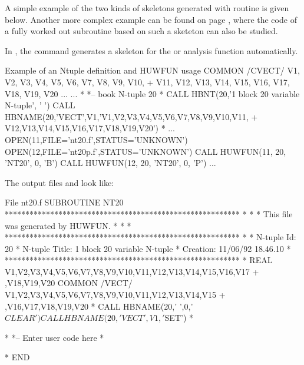 A simple example of the two kinds of skeletons generated with
routine  is given below. 
Another more complex example can be found on page \pageref{sec:staffskeleton},
where the code of a fully worked out subroutine based on such
a sketeton can also be studied.

In \PAW{}, the command  generates a skeleton for the
\RWN{} or \CWN{} analysis function automatically.

\newpage %

\begin{XMPt}{Example of an Ntuple definition and HUWFUN usage}
      COMMON /CVECT/ V1, V2, V3, V4, V5, V6, V7, V8, V9, V10,
     +               V11, V12, V13, V14, V15, V16, V17, V18, V19, V20
      ...
      ...
*
*-- book N-tuple 20
*
      CALL HBNT(20,'1 block 20 variable N-tuple', ' ')
      CALL HBNAME(20,'VECT',V1,'V1,V2,V3,V4,V5,V6,V7,V8,V9,V10,V11,
     +                          V12,V13,V14,V15,V16,V17,V18,V19,V20')
*
      ...
      OPEN(11,FILE='nt20.f',STATUS='UNKNOWN')
      OPEN(12,FILE='nt20p.f',STATUS='UNKNOWN')
      CALL HUWFUN(11, 20, 'NT20', 0, 'B')
      CALL HUWFUN(12, 20, 'NT20', 0, 'P')
      ...
\end{XMPt}
The  output files  and  look like:
\begin{XMPt}{File nt20.f}
      SUBROUTINE NT20
*********************************************************
*                                                       *
* This file was generated by HUWFUN.                    *
*                                                       *
*********************************************************
*
*     N-tuple Id:     20
*     N-tuple Title:  1 block 20 variable N-tuple
*     Creation:       11/06/92 18.46.10
*
*********************************************************
*
      REAL V1,V2,V3,V4,V5,V6,V7,V8,V9,V10,V11,V12,V13,V14,V15,V16,V17
     + ,V18,V19,V20
      COMMON /VECT/ V1,V2,V3,V4,V5,V6,V7,V8,V9,V10,V11,V12,V13,V14,V15
     + ,V16,V17,V18,V19,V20
*
      CALL HBNAME(20,' ',0,'$CLEAR')
      CALL HBNAME(20,'VECT',V1,'$SET')
*

*
*--   Enter user code here
*

*
      END
\end{XMPt}

\newpage%

